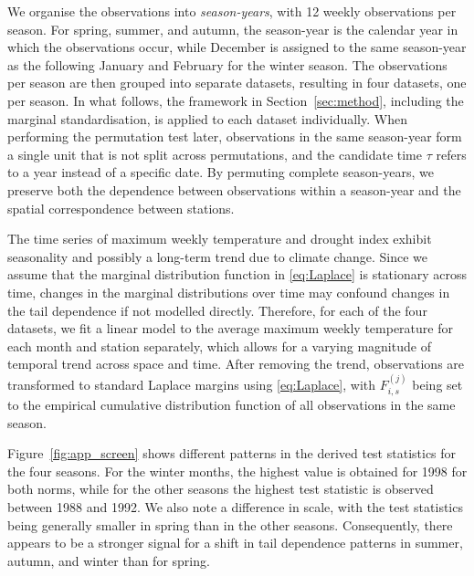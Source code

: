 \documentclass[APA,STIX1COL]{WileyNJD-v2}
\begin{document}
We organise the observations into \emph{season-years}, with 12 weekly observations per season. For spring, summer, and autumn, the season-year is the calendar year in which the observations occur, while December is assigned to the same season-year as the following January and February for the winter season. The observations per season are then grouped into separate datasets, resulting in four datasets, one per season. In what follows, the framework in Section~\ref{sec:method}, including the marginal standardisation, is applied to each dataset individually. When performing the permutation test later, observations in the same season-year form a single unit that is not split across permutations, and the candidate time $\tau$ refers to a year instead of a specific date. By permuting complete season-years, we preserve both the dependence between observations within a season-year and the spatial correspondence between stations.

The time series of maximum weekly temperature and drought index exhibit seasonality and possibly a long-term trend due to climate change. Since we assume that the marginal distribution function in \eqref{eq:Laplace} is stationary across time, changes in the marginal distributions over time may confound changes in the tail dependence if not modelled directly. Therefore, for each of the four datasets, we fit a linear model to the average maximum weekly temperature for each month and station separately, which allows for a varying magnitude of temporal trend across space and time. After removing the trend, observations are transformed to standard Laplace margins using \eqref{eq:Laplace}, with $F_{i,s}^{(j)}$ being set to the empirical cumulative distribution function of all observations in the same season. 

Figure~\ref{fig:app_screen} shows different patterns in the derived test statistics for the four seasons. For the winter months, the highest value is obtained for 1998 for both norms, while for the other seasons the highest test statistic is observed between 1988 and 1992. We also note a difference in scale, with the test statistics being generally smaller in spring than in the other seasons. Consequently, there appears to be a stronger signal for a shift in tail dependence patterns in summer, autumn, and winter than for spring. 
\end{document}
